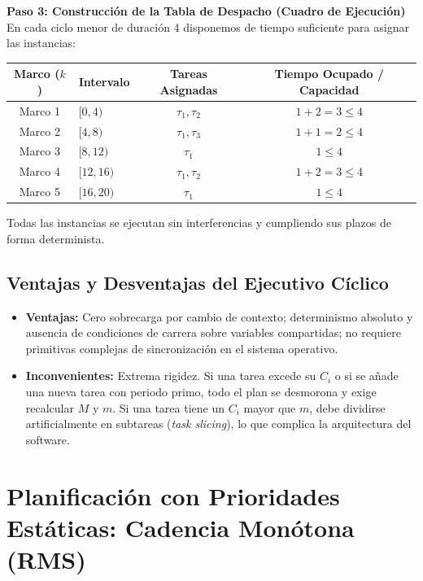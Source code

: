 \begin{ejemplo}
\textbf{Paso 3: Construcción de la Tabla de Despacho (Cuadro de Ejecución)}
En cada ciclo menor de duración 4 disponemos de tiempo suficiente para asignar las instancias:
\begin{center}
\begin{tabular}{clcc}
\toprule
\textbf{Marco ($k$)} & \textbf{Intervalo} & \textbf{Tareas Asignadas} & \textbf{Tiempo Ocupado / Capacidad} \\
\midrule
Marco 1 & $[0, 4)$ & $\tau_1, \tau_2$ & $1 + 2 = 3 \le 4$ \\
Marco 2 & $[4, 8)$ & $\tau_1, \tau_3$ & $1 + 1 = 2 \le 4$ \\
Marco 3 & $[8, 12)$ & $\tau_1$ & $1 \le 4$ \\
Marco 4 & $[12, 16)$ & $\tau_1, \tau_2$ & $1 + 2 = 3 \le 4$ \\
Marco 5 & $[16, 20)$ & $\tau_1$ & $1 \le 4$ \\
\bottomrule
\end{tabular}
\end{center}
Todas las instancias se ejecutan sin interferencias y cumpliendo sus plazos de forma determinista.
\end{ejemplo}

\subsection{Ventajas y Desventajas del Ejecutivo Cíclico}
\begin{itemize}[leftmargin=*]
    \item \textbf{Ventajas:} Cero sobrecarga por cambio de contexto; determinismo absoluto y ausencia de condiciones de carrera sobre variables compartidas; no requiere primitivas complejas de sincronización en el sistema operativo.
    \item \textbf{Inconvenientes:} Extrema rigidez. Si una tarea excede su $C_i$ o si se añade una nueva tarea con periodo primo, todo el plan se desmorona y exige recalcular $M$ y $m$. Si una tarea tiene un $C_i$ mayor que $m$, debe dividirse artificialmente en subtareas (\textit{task slicing}), lo que complica la arquitectura del software.
\end{itemize}

\section{Planificación con Prioridades Estáticas: Cadencia Monótona (RMS)}

